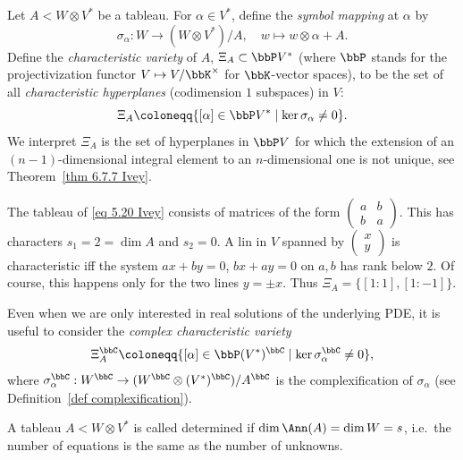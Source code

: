 \begin{defn}\label{def symbol map}
    Let $A<W\otimes V^\ast$ be a tableau. For $\alpha\in V^\ast$, define the \emph{symbol mapping} at $\alpha$ by 
    \[\sigma_\alpha:W\to (W\otimes V^\ast)\slash A,\quad w\mapsto w\otimes\alpha + A.\]
    Define the \emph{characteristic variety} of $A$, $\Xi_A\subset \bbP V^\ast$ (where $\bbP$ stands for the projectivization functor $V\mapsto V\slash \bbK^\times$ for $\bbK$-vector spaces), to be the set of all \emph{characteristic hyperplanes} (codimension $1$ subspaces) in $V$:
    \[\Xi_A\coloneqq \{[\alpha]\in \bbP V^\ast\mid \ker \sigma_\alpha\neq 0\}.\]
    We interpret $\Xi_A$ is the set of hyperplanes in $\bbP V$ for which the extension of an $(n-1)$-dimensional integral element to an $n$-dimensional one is not unique, see Theorem~\ref{thm 6.7.7 Ivey}.
\end{defn}

\begin{example}
    The tableau of \ref{eq 5.20 Ivey} consists of matrices of the form $\left(\begin{smallmatrix}
        a&b\\b&a
    \end{smallmatrix}\right)$. This has characters $s_1=2=\dim A$ and $s_2=0$. A lin in $V$ spanned by $\left(\begin{smallmatrix}
        x\\ y
    \end{smallmatrix}\right)$ is characteristic iff the system $ax+by=0$, $bx+ay=0$ on $a,b$ has rank below $2$. Of course, this happens only for the two lines $y=\pm x$. Thus $\Xi_A=\{[1:1],[1:-1]\}$. 
\end{example}

Even when we are only interested in real solutions of the underlying PDE, it is useful to consider the \emph{complex characteristic variety}
\[\Xi^\bbC_A\coloneqq \{[\alpha]\in \bbP (V^\ast)^\bbC\mid \ker \sigma_\alpha^\bbC\neq 0\},\]
where $\sigma^\bbC_\alpha:W^\bbC\to (W^\bbC\otimes (V^\ast)^\bbC)\slash A^\bbC$ is the complexification of $\sigma_\alpha$ (see Definition~\ref{def complexification}).

\begin{defn}
    A tableau $A<W\otimes V^\ast$ is called determined if $\dim \Ann(A)=\dim W=s$, i.e.\ the number of equations is the same as the number of unknowns.
\end{defn}


